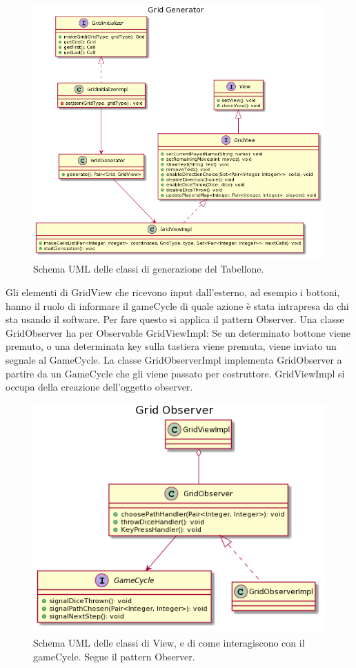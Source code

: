 \documentclass[a4paper,12pt]{report}
\begin{document}
\begin{figure}[!t]
\centering{}
\includegraphics[width=\textwidth]{images/miriana/grid_generator.png}
\caption{Schema UML delle classi di generazione del Tabellone.}
\label{img:gridfactorymethod}
\end{figure}

Gli elementi di GridView che ricevono input dall’esterno, ad esempio i bottoni, hanno il ruolo di informare il gameCycle di quale azione è stata intrapresa da chi sta usando il software.
%
Per fare questo si applica il pattern Observer.
%
Una classe GridObserver ha per Observable GridViewImpl: Se un determinato bottone viene premuto, o una determinata key sulla tastiera viene premuta, viene inviato un segnale al GameCycle.
%
La classe GridObserverImpl implementa GridObserver a partire da un GameCycle che gli viene passato per costruttore.
%
GridViewImpl si occupa della creazione dell'oggetto observer.

\begin{figure}[!t]
\centering{}
\includegraphics[width=\textwidth]{images/miriana/grid_observer.png}
\caption{Schema UML delle classi di View, e di come interagiscono con il gameCycle. Segue il pattern Observer.}
\label{img:gridobserver}
\end{figure}
\end{document}
